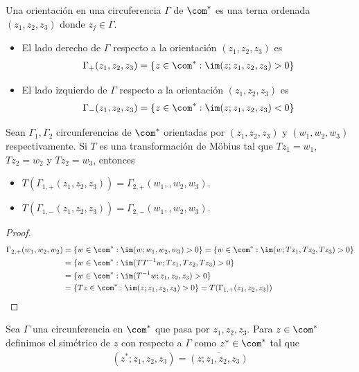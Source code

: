 \begin{defi}
Una orientación en una circuferencia $\Gamma$ de $\com^*$ es una terna ordenada $(z_1,z_2,z_3)$ donde $z_j \in \Gamma$.
\begin{itemize}
    \item El lado derecho de $\Gamma$ respecto a la orientación $(z_1,z_2,z_3)$ es
    \begin{align*}
        \Gamma_+(z_1,z_2,z_3) = \{ z \in \com^* : \im(z;z_1,z_2,z_3) > 0 \}
    \end{align*}
    \item El lado izquierdo de $\Gamma$ respecto a la orientación $(z_1,z_2,z_3)$ es
    \begin{align*}
        \Gamma_-(z_1,z_2,z_3) = \{ z \in \com^* : \im(z;z_1,z_2,z_3) < 0 \}
    \end{align*}
\end{itemize}
\end{defi}

\begin{prop}
Sean $\Gamma_1,\Gamma_2$ circunferencias de $\com^*$ orientadas por $(z_1,z_2,z_3)$ y $(w_1,w_2,w_3)$ respectivamente. Si $T$ es una transformación de M\"obius tal que $Tz_1 = w_1$, $Tz_2 = w_2$ y $Tz_2 = w_3$, entonces
\begin{itemize}
    \item $T(\Gamma_{1, +}(z_1,z_2,z_3)) = \Gamma_{2,+}(w_1,,w_2,w_3)$.
    \item $T(\Gamma_{1, -}(z_1,z_2,z_3)) = \Gamma_{2,-}(w_1,,w_2,w_3)$.
\end{itemize}
\end{prop}

\begin{proof}
\begin{align*}
    \Gamma_{2,+}(w_1,w_2,w_2) &= \{ w \in \com^* : \im(w;w_1,w_2,w_3) > 0\} = \{ w \in \com^* : \im(w;Tz_1,Tz_2,Tz_3) > 0\} \\
    &= \{ w \in \com^* : \im(TT^{-1}w;Tz_1,Tz_2,Tz_3) > 0\} \\
    &= \{ w \in \com^* : \im(T^{-1}w;z_1,z_2,z_3) > 0\} \\
    &= \{Tz \in \com^* : \im(z;z_1,z_2,z_3) > 0 \} = T(\Gamma_{1,+}(z_1,z_2,z_3))
\end{align*}
\end{proof}

\begin{defi}
Sea $\Gamma$ una circunferencia en $\com^*$ que pasa por $z_1,z_2,z_3$. Para $z \in \com^*$ definimos el simétrico de $z$ con respecto a $\Gamma$ como $z^* \in \com^*$ tal que
\begin{align*}
    (z^*;z_1,z_2,z_3) = \overline{(z;z_1,z_2,z_3)}
\end{align*}
\end{defi}

